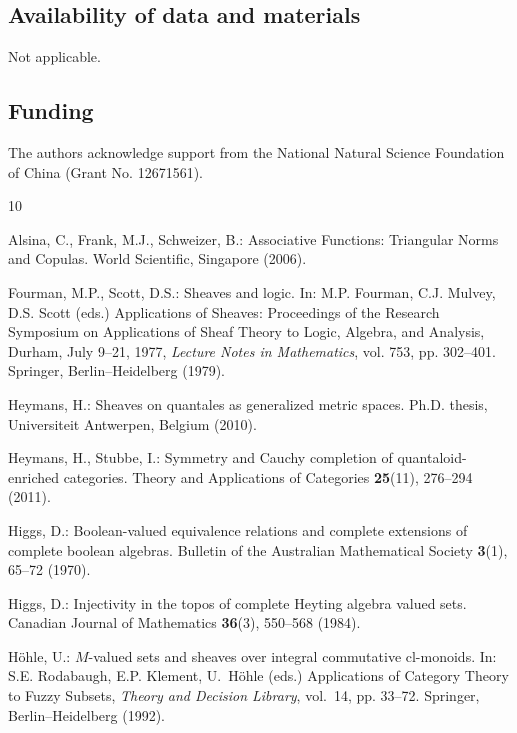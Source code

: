 \documentclass{birkau}
\theoremstyle{plain}
\theoremstyle{definition}
\numberwithin{equation}{section}
\begin{document}
\subsection*{Availability of data and materials}
Not applicable.

\subsection*{Funding}

The authors acknowledge support from the National Natural Science Foundation of China (Grant No. 12671561).

\begin{thebibliography}{10}

Alsina, C., Frank, M.J., Schweizer, B.: Associative Functions: Triangular Norms
  and Copulas.
\newblock World Scientific, Singapore (2006).

Fourman, M.P., Scott, D.S.: Sheaves and logic.
\newblock In: M.P. Fourman, C.J. Mulvey, D.S. Scott (eds.) Applications of
  Sheaves: Proceedings of the Research Symposium on Applications of Sheaf
  Theory to Logic, Algebra, and Analysis, Durham, July 9--21, 1977,
  \emph{Lecture Notes in Mathematics}, vol. 753, pp. 302--401. Springer,
  Berlin--Heidelberg (1979).

Heymans, H.: Sheaves on quantales as generalized metric spaces.
\newblock Ph.D. thesis, Universiteit Antwerpen, Belgium (2010).

Heymans, H., Stubbe, I.: Symmetry and {Cauchy} completion of
  quantaloid-enriched categories.
\newblock Theory and Applications of Categories \textbf{25}(11), 276--294
  (2011).

Higgs, D.: Boolean-valued equivalence relations and complete extensions of
  complete boolean algebras.
\newblock Bulletin of the Australian Mathematical Society \textbf{3}(1), 65--72
  (1970).

Higgs, D.: Injectivity in the topos of complete {Heyting} algebra valued sets.
\newblock Canadian Journal of Mathematics \textbf{36}(3), 550--568 (1984).

H{\"o}hle, U.: {$M$}-valued sets and sheaves over integral commutative
  cl-monoids.
\newblock In: S.E. Rodabaugh, E.P. Klement, U.~H\"{o}hle (eds.) Applications of
  Category Theory to Fuzzy Subsets, \emph{Theory and Decision Library},
  vol.~14, pp. 33--72. Springer, Berlin--Heidelberg (1992).


\end{thebibliography}
\end{document}
